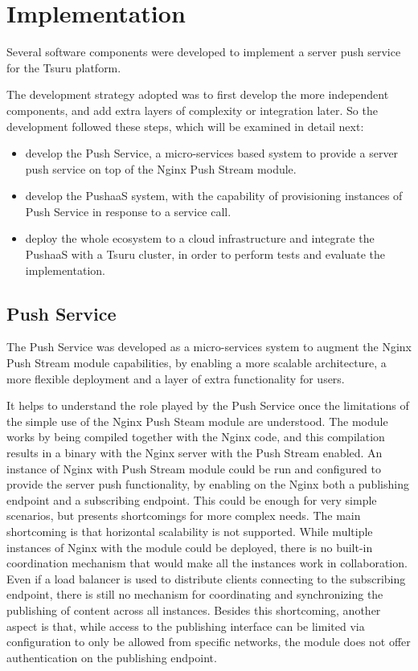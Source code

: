 \section{Implementation} \label{section-implementation}

Several software components were developed to implement a server push service for the Tsuru platform.

The development strategy adopted was to first develop the more independent components, and add extra layers of complexity or integration later. So the development followed these steps, which will be examined in detail next:
\begin{itemize}
    \item develop the Push Service, a micro-services based system to provide a server push service on top of the Nginx Push Stream module.
    \item develop the PushaaS system, with the capability of provisioning instances of Push Service in response to a service call.
    \item deploy the whole ecosystem to a cloud infrastructure and integrate the PushaaS with a Tsuru cluster, in order to perform tests and evaluate the implementation.
\end{itemize}


\subsection{Push Service}

The Push Service was developed as a micro-services system to augment the Nginx Push Stream module capabilities, by enabling a more scalable architecture, a more flexible deployment and a layer of extra functionality for users.

It helps to understand the role played by the Push Service once the limitations of the simple use of the Nginx Push Steam module are understood. The module works by being compiled together with the Nginx code, and this compilation results in a binary with the Nginx server with the Push Stream enabled. An instance of Nginx with Push Stream module could be run and configured to provide the server push functionality, by enabling on the Nginx both a publishing endpoint and a subscribing endpoint. This could be enough for very simple scenarios, but presents shortcomings for more complex needs. The main shortcoming is that horizontal scalability is not supported. While multiple instances of Nginx with the module could be deployed, there is no built-in coordination mechanism that would make all the instances work in collaboration. Even if a load balancer is used to distribute clients connecting to the subscribing endpoint, there is still no mechanism for coordinating and synchronizing the publishing of content across all instances. Besides this shortcoming, another aspect is that, while access to the publishing interface can be limited via configuration to only be allowed from specific networks, the module does not offer authentication on the publishing endpoint.


